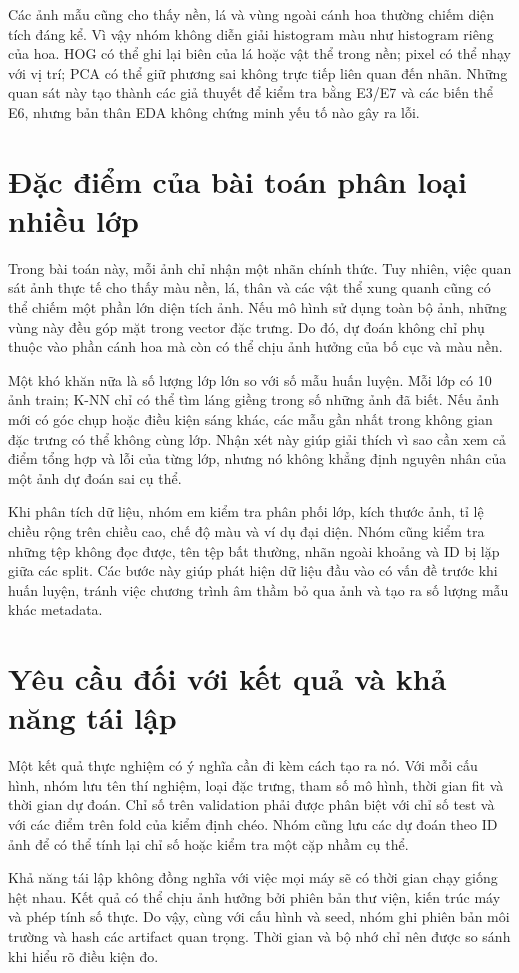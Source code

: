 Các ảnh mẫu cũng cho thấy nền, lá và vùng ngoài cánh hoa thường chiếm diện tích đáng kể. Vì vậy nhóm không diễn giải histogram màu như histogram riêng của hoa. HOG có thể ghi lại biên của lá hoặc vật thể trong nền; pixel có thể nhạy với vị trí; PCA có thể giữ phương sai không trực tiếp liên quan đến nhãn. Những quan sát này tạo thành các giả thuyết để kiểm tra bằng E3/E7 và các biến thể E6, nhưng bản thân EDA không chứng minh yếu tố nào gây ra lỗi.
\section{Đặc điểm của bài toán phân loại nhiều lớp}
Trong bài toán này, mỗi ảnh chỉ nhận một nhãn chính thức. Tuy nhiên, việc quan sát ảnh thực tế cho thấy màu nền, lá, thân và các vật thể xung quanh cũng có thể chiếm một phần lớn diện tích ảnh. Nếu mô hình sử dụng toàn bộ ảnh, những vùng này đều góp mặt trong vector đặc trưng. Do đó, dự đoán không chỉ phụ thuộc vào phần cánh hoa mà còn có thể chịu ảnh hưởng của bố cục và màu nền.

Một khó khăn nữa là số lượng lớp lớn so với số mẫu huấn luyện. Mỗi lớp có 10 ảnh train; K-NN chỉ có thể tìm láng giềng trong số những ảnh đã biết. Nếu ảnh mới có góc chụp hoặc điều kiện sáng khác, các mẫu gần nhất trong không gian đặc trưng có thể không cùng lớp. Nhận xét này giúp giải thích vì sao cần xem cả điểm tổng hợp và lỗi của từng lớp, nhưng nó không khẳng định nguyên nhân của một ảnh dự đoán sai cụ thể.

Khi phân tích dữ liệu, nhóm em kiểm tra phân phối lớp, kích thước ảnh, tỉ lệ chiều rộng trên chiều cao, chế độ màu và ví dụ đại diện. Nhóm cũng kiểm tra những tệp không đọc được, tên tệp bất thường, nhãn ngoài khoảng và ID bị lặp giữa các split. Các bước này giúp phát hiện dữ liệu đầu vào có vấn đề trước khi huấn luyện, tránh việc chương trình âm thầm bỏ qua ảnh và tạo ra số lượng mẫu khác metadata.
\section{Yêu cầu đối với kết quả và khả năng tái lập}
Một kết quả thực nghiệm có ý nghĩa cần đi kèm cách tạo ra nó. Với mỗi cấu hình, nhóm lưu tên thí nghiệm, loại đặc trưng, tham số mô hình, thời gian fit và thời gian dự đoán. Chỉ số trên validation phải được phân biệt với chỉ số test và với các điểm trên fold của kiểm định chéo. Nhóm cũng lưu các dự đoán theo ID ảnh để có thể tính lại chỉ số hoặc kiểm tra một cặp nhầm cụ thể.

Khả năng tái lập không đồng nghĩa với việc mọi máy sẽ có thời gian chạy giống hệt nhau. Kết quả có thể chịu ảnh hưởng bởi phiên bản thư viện, kiến trúc máy và phép tính số thực. Do vậy, cùng với cấu hình và seed, nhóm ghi phiên bản môi trường và hash các artifact quan trọng. Thời gian và bộ nhớ chỉ nên được so sánh khi hiểu rõ điều kiện đo.
